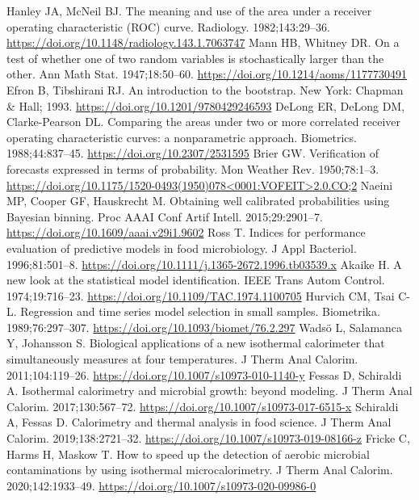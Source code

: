  Hanley JA, McNeil BJ. The meaning and use of the area under a receiver operating characteristic (ROC) curve. Radiology. 1982;143:29--36. \url{https://doi.org/10.1148/radiology.143.1.7063747}
 Mann HB, Whitney DR. On a test of whether one of two random variables is stochastically larger than the other. Ann Math Stat. 1947;18:50--60. \url{https://doi.org/10.1214/aoms/1177730491}
 Efron B, Tibshirani RJ. An introduction to the bootstrap. New York: Chapman \& Hall; 1993. \url{https://doi.org/10.1201/9780429246593}
 DeLong ER, DeLong DM, Clarke-Pearson DL. Comparing the areas under two or more correlated receiver operating characteristic curves: a nonparametric approach. Biometrics. 1988;44:837--45. \url{https://doi.org/10.2307/2531595}
 Brier GW. Verification of forecasts expressed in terms of probability. Mon Weather Rev. 1950;78:1--3. \url{https://doi.org/10.1175/1520-0493(1950)078<0001:VOFEIT>2.0.CO;2}
 Naeini MP, Cooper GF, Hauskrecht M. Obtaining well calibrated probabilities using Bayesian binning. Proc AAAI Conf Artif Intell. 2015;29:2901--7. \url{https://doi.org/10.1609/aaai.v29i1.9602}
 Ross T. Indices for performance evaluation of predictive models in food microbiology. J Appl Bacteriol. 1996;81:501--8. \url{https://doi.org/10.1111/j.1365-2672.1996.tb03539.x}
 Akaike H. A new look at the statistical model identification. IEEE Trans Autom Control. 1974;19:716--23. \url{https://doi.org/10.1109/TAC.1974.1100705}
 Hurvich CM, Tsai C-L. Regression and time series model selection in small samples. Biometrika. 1989;76:297--307. \url{https://doi.org/10.1093/biomet/76.2.297}
 Wadsö L, Salamanca Y, Johansson S. Biological applications of a new isothermal calorimeter that simultaneously measures at four temperatures. J Therm Anal Calorim. 2011;104:119--26. \url{https://doi.org/10.1007/s10973-010-1140-y}
 Fessas D, Schiraldi A. Isothermal calorimetry and microbial growth: beyond modeling. J Therm Anal Calorim. 2017;130:567--72. \url{https://doi.org/10.1007/s10973-017-6515-x}
 Schiraldi A, Fessas D. Calorimetry and thermal analysis in food science. J Therm Anal Calorim. 2019;138:2721--32. \url{https://doi.org/10.1007/s10973-019-08166-z}
 Fricke C, Harms H, Maskow T. How to speed up the detection of aerobic microbial contaminations by using isothermal microcalorimetry. J Therm Anal Calorim. 2020;142:1933--49. \url{https://doi.org/10.1007/s10973-020-09986-0}
